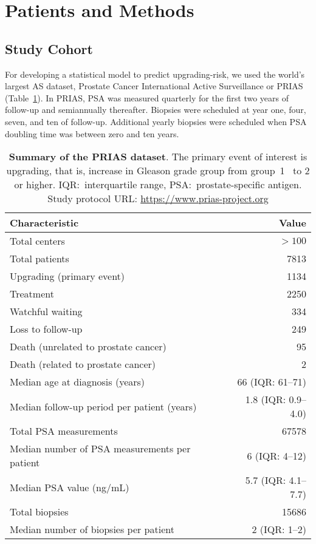 \section{Patients and Methods}
\subsection{Study Cohort}
\label{subsec:cohort}
For developing a statistical model to predict upgrading-risk, we used the world's largest AS dataset, Prostate Cancer International Active Surveillance or PRIAS~\citep{bul2013active} (Table~\ref{table:prias_summary}). In PRIAS, PSA was measured quarterly for the first two years of follow-up and semiannually thereafter. Biopsies were scheduled at year one, four, seven, and ten of follow-up. Additional yearly biopsies were scheduled when PSA doubling time was between zero and ten years.

\begin{table}
\small\sf\centering
\caption{\textbf{Summary of the PRIAS dataset}. The primary event of interest is upgrading, that is, increase in Gleason grade group from group~1~\citep{epsteinGG2014} to 2 or higher. IQR:~interquartile range, PSA:~prostate-specific antigen. Study protocol URL: \url{https://www.prias-project.org}}
\label{table:prias_summary}
\begin{tabular}{lr}
\toprule
\textbf{Characteristic} & \textbf{Value}\\
\midrule
Total centers & $> 100$\\
Total patients & 7813\\
Upgrading (primary event) & 1134\\
Treatment & 2250\\
Watchful waiting & 334\\
Loss to follow-up & 249\\
Death (unrelated to prostate cancer) & 95\\
Death (related to prostate cancer) & 2\\
\midrule
Median age at diagnosis (years) & 66 (IQR: 61--71)\\
Median follow-up period per patient (years) &  1.8 (IQR: 0.9--4.0)\\
Total PSA measurements & 67578\\
Median number of PSA measurements per patient &  6 (IQR: 4--12)\\
Median PSA value (ng/mL) & 5.7 (IQR: 4.1--7.7)\\
Total biopsies & 15686\\
Median number of biopsies per patient &  2 (IQR: 1--2)\\
\bottomrule
\end{tabular}
\end{table}

